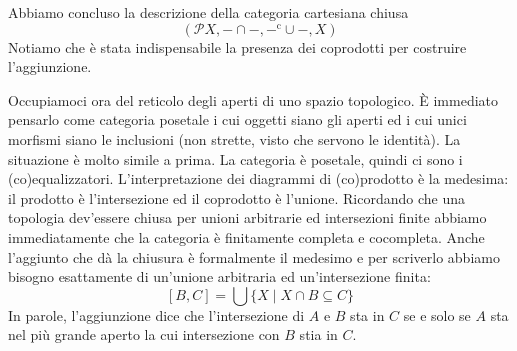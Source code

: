 Abbiamo concluso la descrizione della categoria cartesiana chiusa
\[(\mathcal PX,-\cap-,-^\text{c}\cup-,X)\]
Notiamo che è stata indispensabile la presenza dei coprodotti per costruire l'aggiunzione.


Occupiamoci ora del reticolo degli aperti di uno spazio topologico. È immediato pensarlo come categoria posetale i cui oggetti siano gli aperti ed i cui unici morfismi siano le inclusioni (non strette, visto che servono le identità). La situazione è molto simile a prima. La categoria è posetale, quindi ci sono i (co)equalizzatori. L'interpretazione dei diagrammi di (co)prodotto è la medesima: il prodotto è l'intersezione ed il coprodotto è l'unione. Ricordando che una topologia dev'essere chiusa per unioni arbitrarie ed intersezioni finite abbiamo immediatamente che la categoria è finitamente completa e cocompleta. Anche l'aggiunto che dà la chiusura è formalmente il medesimo e per scriverlo abbiamo bisogno esattamente di un'unione arbitraria ed un'intersezione finita:
\[[B,C]= \bigcup \{ X\mid X\cap B\subseteq C\}\]
In parole, l'aggiunzione dice che l'intersezione di $A$ e $B$ sta in $C$ se e solo se $A$ sta nel più grande aperto la cui intersezione con $B$ stia in $C$.

